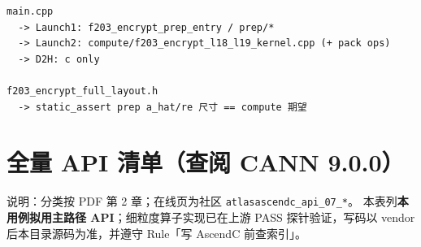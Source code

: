 \documentclass[UTF8,a4paper,11pt]{ctexart}
\begin{document}
\begin{verbatim}
main.cpp
  -> Launch1: f203_encrypt_prep_entry / prep/*
  -> Launch2: compute/f203_encrypt_l18_l19_kernel.cpp (+ pack ops)
  -> D2H: c only

f203_encrypt_full_layout.h
  -> static_assert prep a_hat/re 尺寸 == compute 期望
\end{verbatim}

\section{全量 API 清单（查阅 CANN 9.0.0）}
\label{sec:api-table}

说明：分类按 PDF 第 2 章；在线页为社区 \texttt{atlasascendc\_api\_07\_*}。
本表列\textbf{本用例拟用主路径 API}；细粒度算子实现已在上游 PASS 探针验证，写码以 vendor 后本目录源码为准，并遵守 Rule「写 AscendC 前查索引」。
\end{document}
